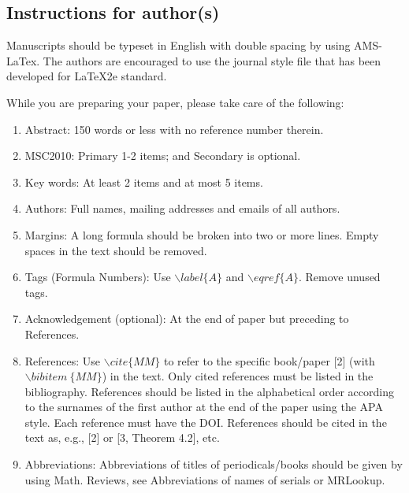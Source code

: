 \documentclass[12pt, reqno]{amsart}
\theoremstyle{definition}
\theoremstyle{remark}
\numberwithin{equation}{section}
\begin{document}
\subsection{Instructions for author(s)}

Manuscripts should be typeset in English with double spacing by
using AMS-LaTex. The authors are encouraged to use the journal style
file that has been developed for LaTeX2e standard.

While you are preparing your paper, please take care of the
following:
\begin{enumerate}
\item Abstract: 150 words or less with no reference number therein.\\
\item MSC2010: Primary 1-2 items; and Secondary is optional.\\

\item Key words: At least 2 items and at most 5 items.\\
\item Authors: Full names, mailing addresses and emails of all authors.\\
\item Margins: A long formula should be broken into two or more lines. Empty spaces in the text should be removed.\\
\item Tags (Formula Numbers): Use $\backslash label\{A\}$ and $\backslash eqref\{A\}$. Remove unused tags. \\
\item Acknowledgement (optional): At the end of paper but preceding to References.\\
\item References: Use $\backslash cite\{MM\}$ to refer to the specific book/paper [2] (with $\backslash bibitem~\{MM\}$) in the text. Only cited references must be listed in the bibliography. References should be listed in the alphabetical order according to the surnames of the first author at the end of the paper using the APA style. Each reference must have the DOI.
References should be cited in the text as, e.g., [2] or [3, Theorem 4.2], etc.  \\
\item Abbreviations: Abbreviations of titles of periodicals/books should be given by using Math. Reviews, see Abbreviations of names of serials or MRLookup.

\end{enumerate}
\end{document}
